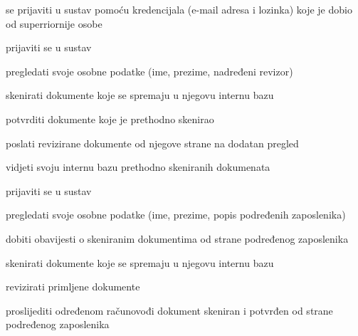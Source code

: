 			
			\begin{packed_enum}
				
				\item  {}
				\begin{packed_enum}
					
					\item se prijaviti u sustav pomoću kredencijala (e-mail adresa i lozinka) koje je dobio od superriornije osobe 
					
				\end{packed_enum}
			
				\item  {}
				\begin{packed_enum}
					
					\item prijaviti se u sustav
					\item pregledati svoje osobne podatke (ime, prezime, nadređeni revizor)
					\item skenirati dokumente koje se spremaju u njegovu internu bazu
					\item potvrditi dokumente koje je prethodno skenirao
					\item poslati revizirane dokumente od njegove strane na dodatan pregled
					\item vidjeti svoju internu bazu prethodno skeniranih dokumenata
					
				\end{packed_enum}
				
				\item  {}
				\begin{packed_enum}
					
					\item prijaviti se u sustav
					\item pregledati svoje osobne podatke (ime, prezime, popis podređenih zaposlenika)
					\item dobiti obavijesti o skeniranim dokumentima od strane podređenog zaposlenika
					\item skenirati dokumente koje se spremaju u njegovu internu bazu
					\item revizirati primljene dokumente
					\item proslijediti određenom računovođi dokument skeniran i potvrđen od strane podređenog zaposlenika
					
				\end{packed_enum}
				

\end{packed_enum}
